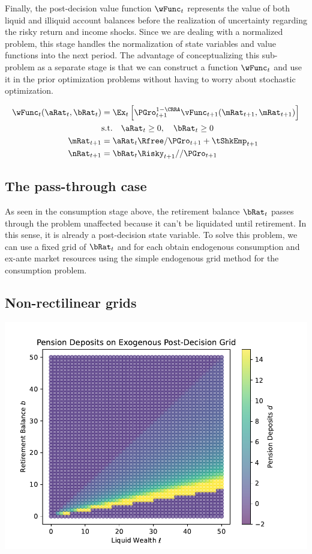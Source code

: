 \documentclass[\econtexRoot/SequentialEGM]{subfiles}
\begin{document}
Finally, the post-decision value function $\wFunc_{t}$ represents the value of both liquid and illiquid account balances before the realization of uncertainty regarding the risky return and income shocks. Since we are dealing with a normalized problem, this stage handles the normalization of state variables and value functions into the next period. The advantage of conceptualizing this sub-problem as a separate stage is that we can construct a function $\wFunc_{t}$ and use it in the prior optimization problems without having to worry about stochastic optimization.

\begin{equation}
        \begin{split}
                \wFunc_{t}(\aRat_{t}, \bRat_{t}) & = \Ex_{t} \left[ \PGro_{t+1}^{1-\CRRA} \vFunc_{t+1}(\mRat_{t+1}, \mRat_{t+1}) \right] \\
                & \text{s.t.} \quad \aRat_{t} \ge 0, \quad \bRat_{t} \ge 0 \\
                \mRat_{t+1} & = \aRat_{t} \Rfree / \PGro_{t+1}  + \tShkEmp_{t+1} \\
                \nRat_{t+1} & = \bRat_{t} \Risky_{t+1} / / \PGro_{t+1}
        \end{split}
\end{equation}

\subsection{The pass-through case}

As seen in the consumption stage above, the retirement balance $\bRat_{t}$ passes through the problem unaffected because it can't be liquidated until retirement. In this sense, it is already a post-decision state variable. To solve this problem, we can use a fixed grid of $\bRat_{t}$ and for each obtain endogenous consumption and ex-ante market resources using the simple endogenous grid method for the consumption problem.

\subsection{Non-rectilinear grids}

\includegraphics[width=\textwidth]{Figures/ExogenousGrid.pdf}
\end{document}
